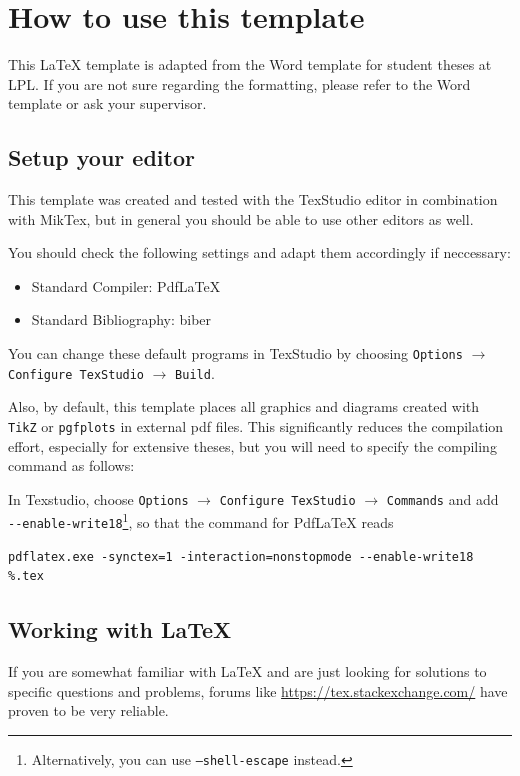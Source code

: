 \chapter{How to use this template}
This \LaTeX{} template is adapted from the Word template for student theses at LPL. If you are not sure regarding
the formatting, please refer to the Word template or ask your supervisor.

\section{Setup your editor}
This template was created and tested with the TexStudio editor in combination with MikTex, but in general you should be able to use other editors as well.


You should check the following settings and adapt them accordingly if neccessary:
\begin{itemize}
	\item Standard Compiler: Pdf\LaTeX
	\item Standard Bibliography: biber
\end{itemize}
You can change these default programs in TexStudio by choosing \texttt{Options} $\rightarrow$ \texttt{Configure TexStudio} $\rightarrow$ \texttt{Build}.

Also, by default, this template places all graphics and diagrams created with \texttt{TikZ} or \texttt{pgfplots}
in external pdf files. This significantly reduces the compilation effort, especially for
extensive theses, but you will need to specify the compiling command as follows:


In Texstudio, choose \texttt{Options} $\rightarrow$ \texttt{Configure TexStudio} $\rightarrow$ \texttt{Commands} and add\\ \verb|--enable-write18|\footnote{Alternatively, you can use \texttt{--shell-escape} instead.}, so that the command for  Pdf\LaTeX{} reads 

\begin{lstlisting}[numbers=none]
	pdflatex.exe -synctex=1 -interaction=nonstopmode --enable-write18 %.tex
\end{lstlisting}


\section{Working with \LaTeX}

If you are somewhat familiar with \LaTeX{} and are just looking for solutions to specific questions and problems, forums like
\url{https://tex.stackexchange.com/} have proven to be very reliable.

